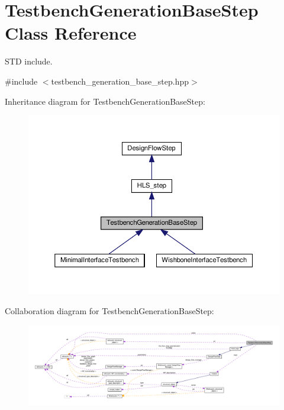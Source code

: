 \hypertarget{classTestbenchGenerationBaseStep}{}\section{Testbench\+Generation\+Base\+Step Class Reference}
\label{classTestbenchGenerationBaseStep}


S\+TD include.  




{\ttfamily \#include $<$testbench\+\_\+generation\+\_\+base\+\_\+step.\+hpp$>$}



Inheritance diagram for Testbench\+Generation\+Base\+Step\+:
\nopagebreak
\begin{figure}[H]
\begin{center}
\leavevmode
\includegraphics[width=350pt]{dc/de3/classTestbenchGenerationBaseStep__inherit__graph}
\end{center}
\end{figure}


Collaboration diagram for Testbench\+Generation\+Base\+Step\+:
\nopagebreak
\begin{figure}[H]
\begin{center}
\leavevmode
\includegraphics[width=350pt]{d5/d36/classTestbenchGenerationBaseStep__coll__graph}
\end{center}
\end{figure}
